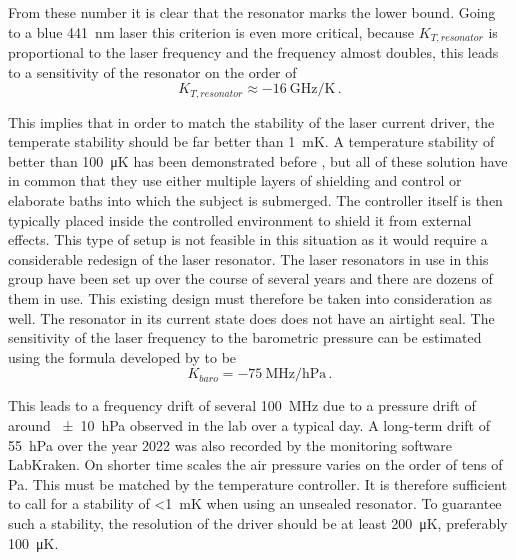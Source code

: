 From these number it is clear that the resonator marks the lower bound. Going to a blue \qty{441}{\nm} laser this criterion is even more critical, because $K_{T,resonator}$ is proportional to the laser frequency and the frequency almost doubles, this leads to a sensitivity of the resonator on the order of
\begin{equation}
    K_{T,resonator} \approx \qty{-16}{\GHz \per \K}\,.
\end{equation}

This implies that in order to match the stability of the laser current driver, the temperate stability should be far better than \qty{1}{\milli \K}. A temperature stability of better than \qty{100}{\micro \K} has been demonstrated before \cite{tempcontroller_10uK,tempcontroller_10uK_jw,tempcontroller_15uK,tempcontroller_30uK,tempcontroller_40uK,tempcontroller_50uK,tempcontroller_65uK}, but all of these solution have in common that they use either multiple layers of shielding and control or elaborate baths into which the subject is submerged. The controller itself is then typically placed inside the controlled environment to shield it from external effects. This type of setup is not feasible in this situation as it would require a considerable redesign of the laser resonator. The laser resonators in use in this group \cite{thesis_tilman} have been set up over the course of several years and there are dozens of them in use. This existing design must therefore be taken into consideration as well. The resonator in its current state does does not have an airtight seal. The sensitivity of the laser frequency to the barometric pressure can be estimated using the formula developed by \citeauthor{ciddor} \cite{ciddor} to be
\begin{equation}
    K_{baro} =  \qty{-75}{\MHz \per \hecto \Pa}\,.
\end{equation}

This leads to a frequency drift of several \qty{100}{\MHz} due to a pressure drift of around \qty{\pm 10}{\hecto \Pa} observed in the lab over a typical day. A long-term drift of \qty{55}{\hecto \Pa} over the year 2022 was also recorded by the monitoring software LabKraken. On shorter time scales the air pressure varies on the order of tens of \unit{\Pa}. This must be matched by the temperature controller. It is therefore sufficient to call for a stability of \qty{<1}{\milli \K} when using an unsealed resonator. To guarantee such a stability, the resolution of the driver should be at least \qty{200}{\micro \K}, preferably \qty{100}{\micro \K}.

